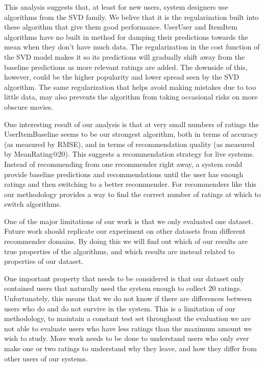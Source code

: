 \documentclass[letterpaper]{sig-alternate}
\begin{document}
  This analysis suggests that, at least for new users, system designers use algorithms from the SVD family.
  We belive that it is the regularization built into these algorithm that give them good performance.
  UserUser and ItemItem algorithms have no built in method for damping their predictions towards the mean when they don't have much data.
  The regularization in the cost function of the SVD model makes it so its predictions will gradually shift away from the baseline predictions as more relevant ratings are added.
  The downside of this, however, could be the higher popularity and lower spread seen by the SVD algorithm.
  The same regularization that helps avoid making mistakes due to too little data, may also prevents the algorithm from taking occasional risks on more obscure movies.

  One interesting result of our analysis is that at very small numbers of ratings the UserItemBaseline seems to be our strongest algorithm, both in terms of accuracy (as measured by RMSE), and in terms of recommendation quality (as measured by MeanRating@20).
  This suggests a recommendation strategy for live systems.
  Instead of recommending from one recommender right away, a system could provide baseline predictions and recommendations until the user has enough ratings and then switching to a better recommender.
  For recommenders like this our methodology provides a way to find the correct number of ratings at which to switch algorithms.



  One of the major limitations of our work is that we only evaluated one dataset.
  Future work should replicate our experiment on other datasets from different recommender domains.
  By doing this we will find out which of our results are true properties of the algorithms, and which results are instead related to properties of our dataset.

  One important property that needs to be considered is that our dataset only contained users that naturally used the system enough to collect 20 ratings.
  Unfortunately, this means that we do not know if there are differences between users who do and do not survive in the system.
  This is a limitation of our methodology, to maintain a constant test set throughout the evaluation we are not able to evaluate users who have less ratings than the maximum amount we wish to study.
  More work needs to be done to understand users who only ever make one or two ratings to understand why they leave, and how they differ from other users of our systems.
\end{document}
